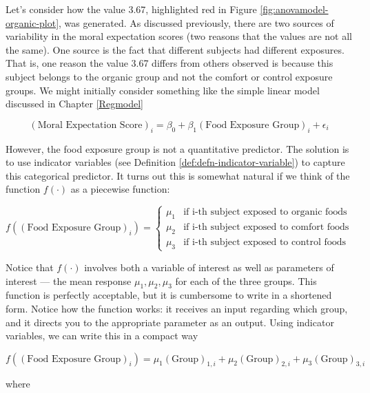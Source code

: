 \documentclass[
]{book}
\theoremstyle{plain}
\theoremstyle{mydefn}
\theoremstyle{myexmpl}
\theoremstyle{remark}
\begin{document}
Let's consider how the value 3.67, highlighted red in Figure \ref{fig:anovamodel-organic-plot}, was generated. As discussed previously, there are two sources of variability in the moral expectation scores (two reasons that the values are not all the same). One source is the fact that different subjects had different exposures. That is, one reason the value 3.67 differs from others observed is because this subject belongs to the organic group and not the comfort or control exposure groups. We might initially consider something like the simple linear model discussed in Chapter \ref{Regmodel}

\[(\text{Moral Expectation Score})_i = \beta_0 + \beta_1 (\text{Food Exposure Group})_i + \epsilon_i\]

However, the food exposure group is not a quantitative predictor. The solution is to use indicator variables (see Definition \ref{def:defn-indicator-variable}) to capture this categorical predictor. It turns out this is somewhat natural if we think of the function \(f(\cdot)\) as a piecewise function:

\[
f\left((\text{Food Exposure Group})_i\right) = \begin{cases}
  \mu_1 & \text{if i-th subject exposed to organic foods} \\
  \mu_2 & \text{if i-th subject exposed to comfort foods} \\
  \mu_3 & \text{if i-th subject exposed to control foods} \end{cases}
\]

Notice that \(f(\cdot)\) involves both a variable of interest as well as parameters of interest --- the mean response \(\mu_1, \mu_2, \mu_3\) for each of the three groups. This function is perfectly acceptable, but it is cumbersome to write in a shortened form. Notice how the function works: it receives an input regarding which group, and it directs you to the appropriate parameter as an output. Using indicator variables, we can write this in a compact way

\[f\left((\text{Food Exposure Group})_i\right) = \mu_1 (\text{Group})_{1,i} + \mu_2 (\text{Group})_{2,i} + \mu_3 (\text{Group})_{3,i}\]

where
\end{document}
